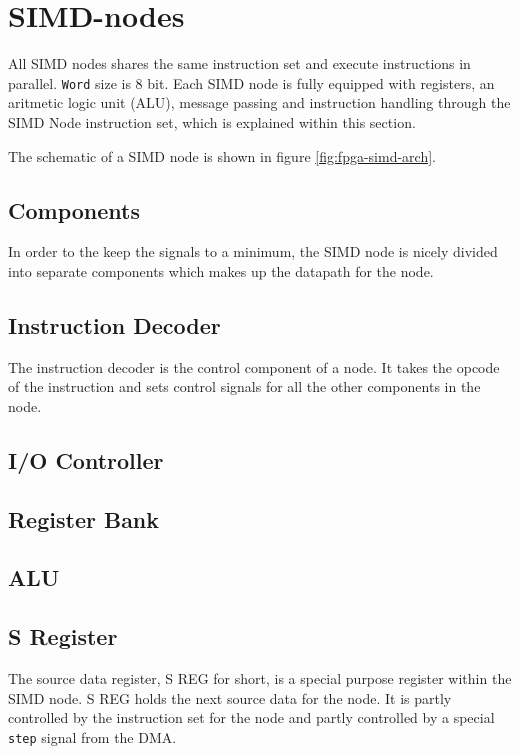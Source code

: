 \section{SIMD-nodes}


All SIMD nodes shares the same instruction set and execute instructions in
parallel. {\tt Word} size is 8 bit. Each SIMD node is fully equipped with
registers, an aritmetic logic unit (ALU), message passing and instruction
handling through the SIMD Node instruction set, which is explained within this
section.

The schematic of a SIMD node is shown in figure
\ref{fig:fpga-simd-arch}. 



\subsection{Components}
In order to the keep the signals to a minimum, the SIMD node is nicely divided
into separate components which makes up the datapath for the node.

\subsection{Instruction Decoder}
The instruction decoder is the control component of a node. It takes the opcode
of the instruction and sets control signals for all the other components in the
node.

\subsection{I/O Controller}

\subsection{Register Bank}

\subsection{ALU}

\subsection{S Register}
The source data register, S REG for short, is a special purpose register within
the SIMD node. S REG holds the next source data for the node. It is partly
controlled by the instruction set for the node and partly controlled by a
special {\tt step} signal from the DMA.

